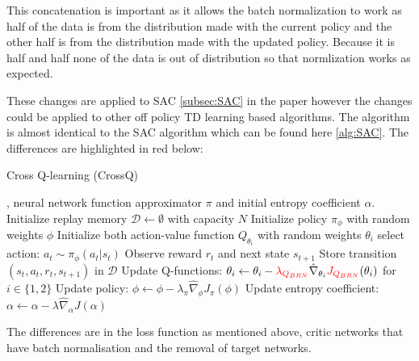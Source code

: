 This concatenation is important as it allows the batch normalization to work as half of the data is from the distribution made with the current policy and the other half is from the distribution made with the updated policy. Because it is half and half none of the data is out of distribution so that normlization works as expected.

These changes are applied to SAC \ref{subsec:SAC} in the paper however the changes could be applied to other off policy TD learning based algorithms. The algorithm is almost identical to the SAC algorithm which can be found here \ref{alg:SAC}. The differences are highlighted in red below:


\begin{algorithm}[H]
\caption{Cross Q-learning (CrossQ)}
\label{alg:CROSSQ}
\begin{algorithmic}[1]
, neural network function approximator $\pi$ and initial entropy coefficient $\alpha$.
\State Initialize replay memory $\mathcal{D} \leftarrow \emptyset$ with capacity $N$
\State Initialize policy $\pi_{\phi}$ with random weights $\phi$
\State Initialize both action-value function $Q_{\theta_i}$ with random weights 
$\theta_i$
\Repeat
        \State select action: $a_{t} \sim \pi_{\phi}(a_{t} | s_{t})$
        \State Observe reward $r_{t}$ and next state $s_{t+1}$
        \State Store transition $(s_{t}, a_{t}, r_{t}, s_{t+1})$ in $\mathcal{D}$
    \EndFor
        \State Update Q-functions: $\theta_{i} \gets \theta_{i} - \textcolor{red}{\lambda_{Q_{BRN}}} \hat{\nabla}_{\theta_{i}} \textcolor{red}{J_{Q_{BRN}}}(\theta_{i})$ for $i \in \{1,2\}$
        \State Update policy: $\phi \gets \phi - \lambda_{\pi} \hat{\nabla}_{\phi} J_{\pi}(\phi)$
        \State Update entropy coefficient: $\alpha \gets \alpha - \lambda \hat{\nabla}_{\alpha} J(\alpha)$
    \EndFor
{}

\end{algorithmic}
\end{algorithm}
The differences are in the loss function as mentioned above, critic networks that have batch normalisation and the removal of target networks.